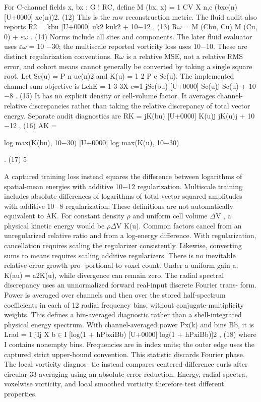 \documentclass[11pt]{article}
\begin{document}
For C-channel fields x, bx : G ! RC, define
M (bx, x) = 1
CV
X
n,c
(bxc(n) [U+0000] xc(n))2. (12)
This is the raw reconstruction metric. The fluid audit also reports
R2 = kbu [U+0000] uk2
kuk2 + 10\ensuremath{-}12 , (13)
R\ensuremath{\omega} = M (Cbu, Cu)
M (Cu, 0) + \ensuremath{\varepsilon}\ensuremath{\omega}
. (14)
Norms include all sites and components. The later fluid evaluator uses \ensuremath{\varepsilon}\ensuremath{\omega} = 10 \ensuremath{-}30; the multiscale
reported vorticity loss uses 10\ensuremath{-}10. These are distinct regularization conventions. R\ensuremath{\omega} is a relative
MSE, not a relative RMS error, and cohort means cannot generally be converted by taking a single
square root.
Let Sc(u) = P
n uc(n)2 and K(u) = 1
2
P
c Sc(u). The implemented channel-sum objective is
LchE = 1
3
3X
c=1
jSc(bu) [U+0000] Sc(u)j
Sc(u) + 10\ensuremath{-}8 . (15)
It has no explicit density or cell-volume factor. It averages channel-relative discrepancies rather
than taking the relative discrepancy of total vector energy. Separate audit diagnostics are
RK = jK(bu) [U+0000] K(u)j
jK(u)j + 10\ensuremath{-}12 , (16)
AK =


log max(K(bu), 10\ensuremath{-}30) [U+0000] log max(K(u), 10\ensuremath{-}30)


. (17)
5

A captured training loss instead squares the difference between logarithms of spatial-mean energies
with additive 10\ensuremath{-}12 regularization. Multiscale training includes absolute differences of logarithms
of total vector squared amplitudes with additive 10\ensuremath{-}8 regularization. These definitions are not
automatically equivalent to AK.
For constant density \ensuremath{\rho} and uniform cell volume \ensuremath{\Delta}V , a physical kinetic energy would be \ensuremath{\rho}\ensuremath{\Delta}V K(u).
Common factors cancel from an unregularized relative ratio and from a log-energy difference. With
regularization, cancellation requires scaling the regularizer consistently. Likewise, converting sums
to means requires scaling additive regularizers. There is no inevitable relative-error growth pro-
portional to voxel count. Under a uniform gain a, K(au) = a2K(u), while divergence can remain
zero.
The radial spectral discrepancy uses an unnormalized forward real-input discrete Fourier trans-
form. Power is averaged over channels and then over the stored half-spectrum coefficients in each
of 12 radial frequency bins, without conjugate-multiplicity weights. This defines a bin-averaged
diagnostic rather than a shell-integrated physical energy spectrum. With channel-averaged power
Px(k) and bins Bb, it is
Lrad = 1
jIj
X
b\ensuremath{\in}I
[log(1 + hPbxiBb) [U+0000] log(1 + hPxiBb)]2 , (18)
where I contains nonempty bins. Frequencies are in index units; the outer edge uses the captured
strict upper-bound convention. This statistic discards Fourier phase. The local vorticity diagnos-
tic instead compares centered-difference curls after circular 33 averaging using an absolute-error
reduction. Energy, radial spectra, voxelwise vorticity, and local smoothed vorticity therefore test
different properties.
\end{document}
